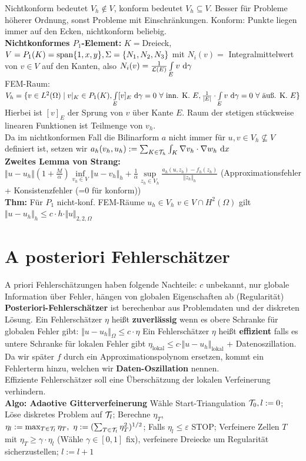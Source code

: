 \documentclass[12pt]{scrartcl}
\begin{document}
	Nichtkonform bedeutet $V_h\not\in V$, konform bedeutet $V_h\subseteq V$.
	Besser für Probleme höherer Ordnung, sonst Probleme mit Einschränkungen.
	Konform: Punkte liegen immer auf den Ecken, nichtkonform beliebig.\\
	\textbf{Nichtkonformes $P_1$-Element:} $K=$Dreieck, $V=P_1(K)=\operatorname{span}\lbrace 1,x,y\rbrace,\Sigma=\lbrace N_1,N_2,N_3\rbrace$ mit $N_i(v)=$ Integralmittelwert von $v\in V$ auf den Kanten, also $N_i(v)=\frac{1}{\mathcal{L}(E)}\int\limits_E v\text{ d}\gamma$\\
	FEM-Raum: $V_h=\lbrace v\in L^2(\Omega)\mid	v|_K\in P_1(K),\int\limits_E [v]_E\text{ d}\gamma=0~\forall	\text{ inn. K. $E$},	\frac{1}{|E|}\cdot\int\limits_E v\text{ d}\gamma=0~\forall\text{ äuß. K. }E\rbrace$\\
	Hierbei ist $[v]_E$ der Sprung von $v$ über Kante $E$. Raum der stetigen stückweise linearen Funktionen ist Teilmenge von $v_h$.\\
	Da im nichtkonformen Fall die Bilinarform $a$ nicht immer für $u,v\in V_h\not\subseteq V$ definiert ist, setzen wir $a_h(v_h,u_h):=\sum_{K\in\mathcal{T}_h}\int_K \nabla v_h\cdot\nabla w_h\text{ d} x$\\
	\textbf{Zweites Lemma von Strang:} $\Vert u-u_h\Vert(1+\frac{M}{\alpha})\inf\limits_{v_h\in V}\Vert u-v_h\Vert_h+\frac{1}{\alpha}\sup\limits_{z_h\in V_h}\frac{a_h(u,z_h)-f_h(z_h)}{\Vert z_h\Vert_h}$ (Approximationsfehler + Konsistenzfehler (=0 für konform))\\
	\textbf{Thm:} Für $P_1$ nicht-konf. FEM-Räume $u_h\in V_h$ $v\in V\cap H^2(\Omega)$ gilt $\Vert u-u_h\Vert_h\leq c\cdot h\cdot\Vert u\Vert_{2,2,\Omega}$
	
	\section{A posteriori Fehlerschätzer}
	
	A priori Fehlerschätzungen haben folgende Nachteile: $c$ unbekannt, nur globale Information über Fehler, hängen von globalen Eigenschaften ab (Regularität)\\
	\textbf{Posteriori-Fehlerschätzer} ist berechenbar aus Problemdaten und der diskreten Lösung.
	Ein Fehlerschätzer $\eta$ heißt \textbf{zuverlässig} wenn es obere Schranke für globalen Fehler gibt: $\Vert u-u_h\Vert_\Omega\leq c\cdot\eta$
	Ein Fehlerschätzer $\eta$ heißt \textbf{effizient} falls es untere Schranke für lokalen Fehler gibt $\eta_{\text{lokal}}\leq c\cdot\Vert u-u_h\Vert_{\text{lokal}}$ + Datenoszillation.
	Da wir später $f$ durch ein Approximationspolynom ersetzen, kommt ein Fehlerterm hinzu, welchen wir \textbf{Daten-Oszillation} nennen.\\
	Effiziente Fehlerschätzer soll eine Überschätzung der lokalen Verfeinerung verhindern.\\
	\textbf{Algo: Adaotive Gitterverfeinerung} Wähle Start-Triangulation $\mathcal{T}_0,l:=0$; Löse diskretes Problem auf $\mathcal{T}_l$; Berechne $\eta_T$, $\eta_l:=\max_{T\in\mathcal{T}_l}\eta_T,~\eta:=(\sum_{T\in\mathcal{T}_l}\eta_T^2)^{1/2}$; Falls $\eta_l\leq\varepsilon$ STOP; Verfeinere Zellen $T$ mit $\eta_T\geq\gamma\cdot\eta_l$ (Wähle $\gamma\in[0,1]$ fix), verfeinere Dreiecke um Regularität sicherzustellen; $l:=l+1$
	
\end{document}
